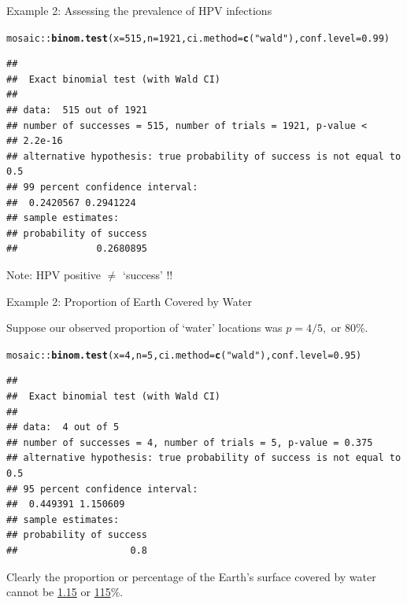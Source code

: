\documentclass{beamer}\usepackage[]{graphicx}\usepackage[]{color}
\newcommand{\hlnum}[1]{\textcolor[rgb]{0.686,0.059,0.569}{#1}}%
\newcommand{\hlstr}[1]{\textcolor[rgb]{0.192,0.494,0.8}{#1}}%
\newcommand{\hlopt}[1]{\textcolor[rgb]{0,0,0}{#1}}%
\newcommand{\hlstd}[1]{\textcolor[rgb]{0.345,0.345,0.345}{#1}}%
\newcommand{\hlkwc}[1]{\textcolor[rgb]{0.333,0.667,0.333}{#1}}%
\newcommand{\hlkwd}[1]{\textcolor[rgb]{0.737,0.353,0.396}{\textbf{#1}}}%
\newenvironment{knitrout}{}{} %
\begin{document}
\begin{frame}[fragile]{Example 2: Assessing the prevalence of HPV infections}

\begin{knitrout}\tiny
{}\color{fgcolor}
\begin{alltt}
\hlstd{mosaic}\hlopt{::}\hlkwd{binom.test}\hlstd{(}\hlkwc{x} \hlstd{=} \hlnum{515}\hlstd{,} \hlkwc{n} \hlstd{=} \hlnum{1921}\hlstd{,} \hlkwc{ci.method}\hlstd{=}\hlkwd{c}\hlstd{(}\hlstr{"wald"}\hlstd{),} \hlkwc{conf.level}\hlstd{=}\hlnum{0.99}\hlstd{)}
\end{alltt}
\begin{verbatim}
## 
## 	Exact binomial test (with Wald CI)
## 
## data:  515 out of 1921
## number of successes = 515, number of trials = 1921, p-value <
## 2.2e-16
## alternative hypothesis: true probability of success is not equal to 0.5
## 99 percent confidence interval:
##  0.2420567 0.2941224
## sample estimates:
## probability of success 
##              0.2680895
\end{verbatim}

\end{knitrout}
Note: HPV positive $\ne$ `success' !!
\end{frame}



\begin{frame}[fragile]{Example 2: Proportion of Earth Covered by Water}

Suppose our observed proportion of `water' locations was $p = 4/5,$ or 80\%.

\begin{knitrout}\tiny
{}\color{fgcolor}
\begin{alltt}
\hlstd{mosaic}\hlopt{::}\hlkwd{binom.test}\hlstd{(}\hlkwc{x} \hlstd{=} \hlnum{4}\hlstd{,} \hlkwc{n} \hlstd{=} \hlnum{5}\hlstd{,} \hlkwc{ci.method}\hlstd{=}\hlkwd{c}\hlstd{(}\hlstr{"wald"}\hlstd{),} \hlkwc{conf.level}\hlstd{=}\hlnum{0.95}\hlstd{)}
\end{alltt}
\begin{verbatim}
## 
## 	Exact binomial test (with Wald CI)
## 
## data:  4 out of 5
## number of successes = 4, number of trials = 5, p-value = 0.375
## alternative hypothesis: true probability of success is not equal to 0.5
## 95 percent confidence interval:
##  0.449391 1.150609
## sample estimates:
## probability of success 
##                    0.8
\end{verbatim}

\end{knitrout}

\pause 

Clearly  the proportion or percentage of the Earth's surface covered by water cannot
be \underline{1.15} or \underline{115}\%.  

\end{frame}
\end{document}
